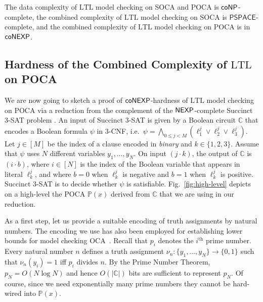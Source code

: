 \documentclass[times,envcountsame]{llncs}
\def\PSPACE{{\mathsf{PSPACE}}}
\newcommand{\circuit}{\ensuremath{\mathbb{C}}}
\newcommand{\Poca}{\mathbb{P}}
\newcommand{\ltl}{\text{LTL}}
\begin{document}
\begin{proposition}
  The data complexity of $\ltl$ model checking on SOCA and POCA is
  ${\mathsf{coNP}}$-complete, the combined complexity of $\ltl$ model
  checking on SOCA is $\PSPACE$-complete, and the combined complexity
  of $\ltl$ model checking on POCA is in ${\mathsf{coNEXP}}$.
\end{proposition}


\subsection{Hardness of the Combined Complexity of $\ltl$ on POCA}

We are now going to sketch a proof of ${\mathsf{coNEXP}}$-hardness of $\ltl$
model checking on POCA via a reduction from the complement of
the ${\mathsf{NEXP}}$-complete \textsf{Succinct 3-SAT} problem \cite{Papa94}.
An input of \textsf{Succinct 3-SAT} is given by a
Boolean circuit $\mathbb{C}$ that encodes a Boolean formula $\psi$ in
3-CNF, i.e.\ $\psi=\bigwedge_{0\le j< M}(\ell^j_1\vee \ell^j_2\vee
\ell^j_3)$. Let $j\in [M]$ be the index of a clause encoded in
\emph{binary} and $k\in\{1,2,3\}$. Assume that $\psi$ uses
$N$ different variables $y_1,\ldots,y_N$.
 On input $(j\cdot k)$, the output
of $\circuit$ is $(i\cdot b)$, where $i\in [N]$
 is the index of the Boolean variable that appears in
literal $\ell_k^j$, and where $b=0$ when $\ell_k^j$ is negative
and $b=1$ when $\ell_k^j$ is positive.
 \textsf{Succinct 3-SAT} is to decide whether $\psi$ is satisfiable. Fig.\
\ref{fig:high-level} depicts on a high-level the POCA $\Poca(x)$ derived from
$\circuit$ that we are using in our reduction.

As a first step, let us provide a suitable encoding of truth assignments
by natural numbers. The encoding we use has also been employed for establishing
lower bounds for model checking OCA~\cite{JKMZ04-ic}.
Recall that $p_i$ denotes the $i^{\text{th}}$ prime
number.
 Every natural number $n$ defines a truth assignment
 $\nu_n:\{y_1,\ldots,y_N\} \to \{ 0,1\}$ such that $\nu_n(y_i)=1$
iff $p_i$ divides $n$.
By the Prime
Number Theorem, $p_N=O(N \log N)$ and hence $O(|\circuit|)$ bits are
sufficient to represent $p_N$. Of course, since we need exponentially
many prime numbers they cannot be hard-wired into $\Poca(x)$.
\end{document}
